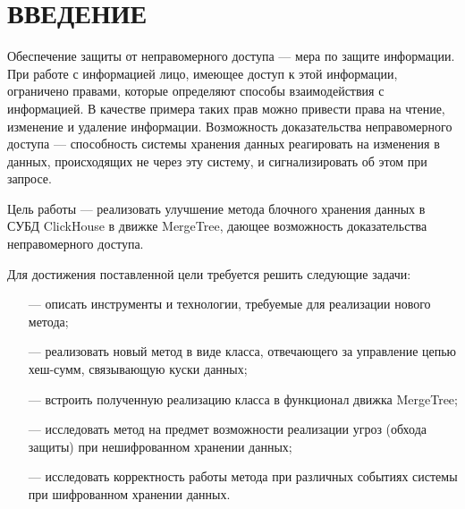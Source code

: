 \section*{ВВЕДЕНИЕ}

Обеспечение защиты от неправомерного доступа --- мера по защите информации. При работе с информацией лицо, имеющее доступ к этой информации, ограничено правами, которые определяют способы взаимодействия с информацией. В качестве примера таких прав можно привести права на чтение, изменение и удаление информации. Возможность доказательства неправомерного доступа --- способность системы хранения данных реагировать на изменения в данных, происходящих не через эту систему, и сигнализировать об этом при запросе.

Цель работы --- реализовать улучшение метода блочного хранения данных в СУБД ClickHouse в движке MergeTree, дающее возможность доказательства неправомерного доступа.

Для достижения поставленной цели требуется решить следующие задачи:
\begin{itemize}
	\item [---] описать инструменты и технологии, требуемые для реализации нового метода;
	\item [---] реализовать новый метод в виде класса, отвечающего за управление цепью хеш-сумм, связывающую куски данных;
	\item [---] встроить полученную реализацию класса в функционал движка MergeTree;
	\item [---] исследовать метод на предмет возможности реализации угроз (обхода защиты) при нешифрованном хранении данных;
	\item [---] исследовать корректность работы метода при различных событиях системы при шифрованном хранении данных.
\end{itemize}
\pagebreak
